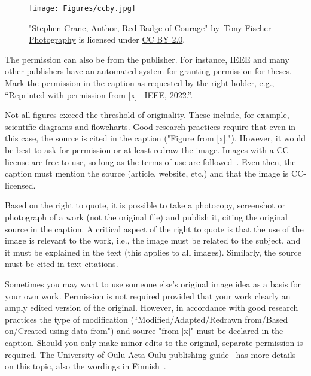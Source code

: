 \begin{figure}[H]
  \begin{center}
    \texttt{[image: Figures/ccby.jpg]}
  \end{center}
    \caption{"\href{https://openverse.org/image/110032f8-1a7a-421f-86b1-88fdfde2e44f }{Stephen Crane, Author, Red Badge of Courage}" by~\href{https://www.flickr.com/photos/tonythemisfit/}{Tony Fischer Photography} is licensed under \href{https://creativecommons.org/licenses/by/2.0/}{CC BY 2.0}.}
    \label{fig:ccbypic}
\end{figure}

The permission can also be from the publisher. For instance, IEEE
and many other publishers have an automated system for granting
permission for theses. Mark the permission in the caption as requested
by the right holder, e.g., “Reprinted with permission from [x]
\textcopyright\ IEEE, 2022.”.

Not all figures exceed the threshold of originality. These include,
for example, scientific diagrams and flowcharts. Good research
practices require that even in this case, the source is cited in the
caption ("Figure from [x]."). However, it would be best to ask
for permission or at least redraw the image. Images with a CC license
are free to use, so long as the terms of use are
followed~\cite{about_cc_licenses}. Even then, the caption must mention
the source (article, website, etc.) and that the image is CC-licensed.

Based on the right to quote, it is possible to take a photocopy,
screenshot or photograph of a work (not the original file) and publish
it, citing the original source in the caption. A critical aspect of
the right to quote is that the use of the image is relevant to the
work, i.e., the image must be related to the subject, and it must be
explained in the text (this applies to all images). Similarly, the
source must be cited in text citations.

Sometimes you may want to use someone else's original image idea as a
basis for your own work. Permission is not required provided that your
work clearly an amply edited version of the original. However, in
accordance with good research practices the type of modification
(“Modified/Adapted/Redrawn from/Based on/Created using data from") and
source "from [x]" must be declared in the caption. Should you only
make minor edits to the original, separate permission is required. The
University of Oulu Acta Oulu publishing
guide~\cite{ronkainen_copyright} has more details on this topic, also
the wordings in Finnish~\cite{ronkainen_tekijanoikeus}.

